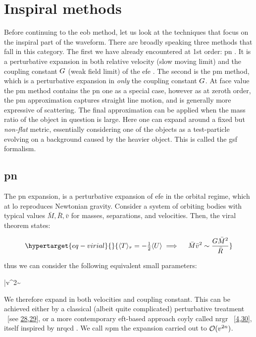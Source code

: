\documentclass[
  11pt,
  a4paper,
  DIV=11,
  numbers=noendperiod,
  twoside]{scrreprt}
\let\[\relax \let\]\relax %
\DeclareRobustCommand{\[}{\begin{equation}}
\DeclareRobustCommand{\]}{\end{equation}}
\begin{document}
\hypertarget{inspiral-methods}{%
\section{Inspiral methods}\label{inspiral-methods}}

Before continuing to the \gls{eob} method, let us look at the techniques
that focus on the inspiral part of the waveform. There are broadly
speaking three methods that fall in this category. The first we have
already encountered at 1st order: \gls{pn} . It is a perturbative
expansion in both relative velocity (slow moving limit) and the coupling
constant \(\grav\) (weak field limit) of the \gls{efe} . The second is
the \gls{pm} method, which is a perturbative expansion in \emph{only}
the coupling constant \(\grav\). At face value the \gls{pm} method
contains the \gls{pn} one as a special case, however as at zeroth order,
the \gls{pm} approximation captures straight line motion, and is
generally more expressive of scattering. The final approximation can be
applied when the mass ratio of the object in question is large. Here one
can expand around a fixed but \emph{non-flat} metric, essentially
considering one of the objects as a test-particle evolving on a
background caused by the heavier object. This is called the \gls{gsf}
formalism.

\hypertarget{pn}{%
\subsection{\texorpdfstring{\gls{pn}}{}}\label{pn}}

The \gls{pn} expansion, is a perturbative expansion of \gls{efe} in the
orbital regime, which at \gls{lo} reproduces Newtonian gravity. Consider
a system of orbiting bodies with typical values
\(\bar{M},\bar{R},\bar{v}\) for masses, separations, and velocities.
Then, the viral theorem states:

\begin{equation}\protect\hypertarget{eq-virial}{}{
\ang{T}_\tau=-\half \ang{U} \implies \quad \bar{M} \bar{v}^2\sim \frac{G \bar{M}^2}{\bar{R}}
}\label{eq-virial}\end{equation}

thus we can consider the following equivalent small parameters:

\[
\bar{v}^2\sim {}
\]

We therefore expand in both velocities and coupling constant. This can
be achieved either by a classical (albeit quite complicated)
perturbative treatment ~{[}see
\protect\hyperlink{ref-Blanchet:2013haa}{28},\protect\hyperlink{ref-Blanchet:1995fg}{29}{]},
or a more contemporary \gls{eft}-based approach coyly called \gls{nrgr}
~{[}\protect\hyperlink{ref-Goldberger:2004jt}{4},\protect\hyperlink{ref-Sturani:2021xpq}{30}{]},
itself inspired by \gls{nrqcd} . We call \(n\)\gls{pm} the expansion
carried out to \(\order[2n]{v}\).
\end{document}
